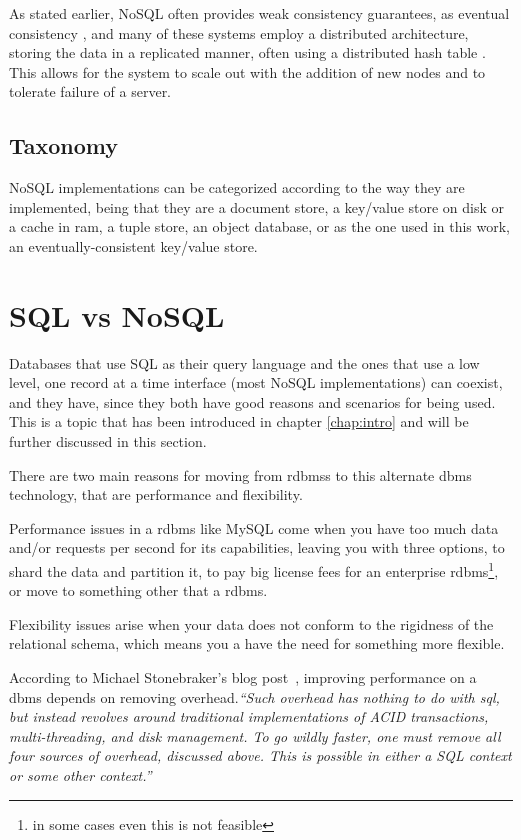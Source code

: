 As stated earlier, NoSQL often provides weak consistency guarantees, as eventual consistency \cite{Vogels2008}, and many of these systems employ a distributed architecture, storing the data in a replicated manner, often using a distributed hash table \cite{Tanner}. This allows for the system to scale out with the addition of new nodes and to tolerate failure of a server.

\subsection{Taxonomy}
NoSQL implementations can be categorized according to the way they are implemented, being that they are a document store, a key/value store on disk or a cache in \ac{ram}, a tuple store, an object database, or as the one used in this work, an eventually-consistent key/value store.\\

\section{SQL vs NoSQL}
Databases that use SQL as their query language and the ones that use a low level, one record at a time interface (most NoSQL implementations) can coexist, and they have, since they both have good reasons and scenarios for being used. This is a topic that has been introduced in chapter \ref{chap:intro} and will be further discussed in this section.

There are two main reasons for moving from \acp{rdbms} to this alternate \ac{dbms} technology, that are performance and flexibility. 

Performance issues in a \ac{rdbms} like MySQL come when you have too much data and/or requests per second for its capabilities, leaving you with three options, to shard the data and partition it, to pay big license fees for an enterprise \ac{rdbms}\footnote{in some cases even this is not feasible}, or move to something other that a \ac{rdbms}.

Flexibility issues arise when your data does not conform to the rigidness of the relational schema, which means you a have the need for something more flexible.

According to Michael Stonebraker's blog post~\cite{stoneDisc}, improving performance on a \ac{dbms} depends on removing overhead.\emph{``Such overhead has nothing to do with \ac{sql}, but instead revolves around traditional implementations of ACID transactions, multi-threading, and disk management. To go wildly faster, one must remove all four sources of overhead, discussed above. This is possible in either a SQL context or some other context.''}

